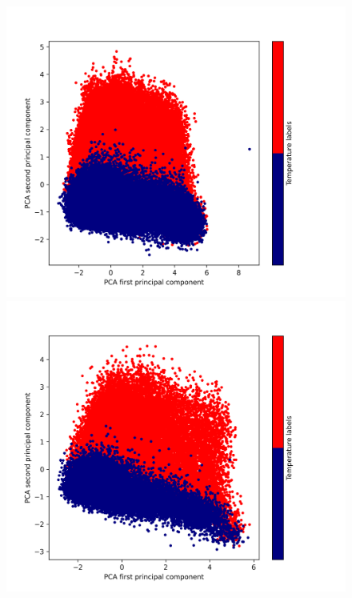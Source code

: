 \documentclass[12pt]{report}
\begin{document}
	\begin{figure}[h!]
		\centering
		\includegraphics[scale=0.3]{003_train_v2_PCA.png}
		\includegraphics[scale=0.3]{003_validate_v2_PCA.png}


\end{figure}
\end{document}
